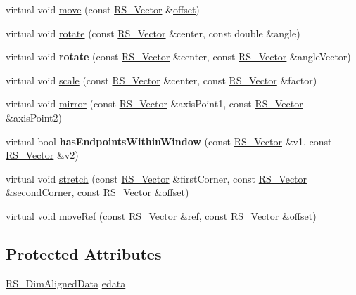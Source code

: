 \begin{DoxyCompactItemize}
\item 
virtual void \hyperlink{classRS__DimAligned_a547e15d7f73058ee892019d69a52c0ac}{move} (const \hyperlink{classRS__Vector}{R\-S\-\_\-\-Vector} \&\hyperlink{classRS__Entity_aa296d21b9aac99161d386ce2f60f0fea}{offset})
\item 
virtual void \hyperlink{classRS__DimAligned_aa40aab80018a3782c5bc3e0084372def}{rotate} (const \hyperlink{classRS__Vector}{R\-S\-\_\-\-Vector} \&center, const double \&angle)
\item 
\hypertarget{classRS__DimAligned_af675c46c8cee55a48d40d0eff4ddb594}{virtual void {\bfseries rotate} (const \hyperlink{classRS__Vector}{R\-S\-\_\-\-Vector} \&center, const \hyperlink{classRS__Vector}{R\-S\-\_\-\-Vector} \&angle\-Vector)}\label{classRS__DimAligned_af675c46c8cee55a48d40d0eff4ddb594}

\item 
virtual void \hyperlink{classRS__DimAligned_a1c66d0395c48a869a1689f5787a35044}{scale} (const \hyperlink{classRS__Vector}{R\-S\-\_\-\-Vector} \&center, const \hyperlink{classRS__Vector}{R\-S\-\_\-\-Vector} \&factor)
\item 
virtual void \hyperlink{classRS__DimAligned_a8607e742167c41abd37adf7a8a0aecd2}{mirror} (const \hyperlink{classRS__Vector}{R\-S\-\_\-\-Vector} \&axis\-Point1, const \hyperlink{classRS__Vector}{R\-S\-\_\-\-Vector} \&axis\-Point2)
\item 
\hypertarget{classRS__DimAligned_ab1a83d26da6eb6d74fc95ee2a72bd707}{virtual bool {\bfseries has\-Endpoints\-Within\-Window} (const \hyperlink{classRS__Vector}{R\-S\-\_\-\-Vector} \&v1, const \hyperlink{classRS__Vector}{R\-S\-\_\-\-Vector} \&v2)}\label{classRS__DimAligned_ab1a83d26da6eb6d74fc95ee2a72bd707}

\item 
virtual void \hyperlink{classRS__DimAligned_a5a87eb946efb2fd52e5f4818992b9482}{stretch} (const \hyperlink{classRS__Vector}{R\-S\-\_\-\-Vector} \&first\-Corner, const \hyperlink{classRS__Vector}{R\-S\-\_\-\-Vector} \&second\-Corner, const \hyperlink{classRS__Vector}{R\-S\-\_\-\-Vector} \&\hyperlink{classRS__Entity_aa296d21b9aac99161d386ce2f60f0fea}{offset})
\item 
virtual void \hyperlink{classRS__DimAligned_a6b31df2f9af8cb4b3e1ef13f6279b31c}{move\-Ref} (const \hyperlink{classRS__Vector}{R\-S\-\_\-\-Vector} \&ref, const \hyperlink{classRS__Vector}{R\-S\-\_\-\-Vector} \&\hyperlink{classRS__Entity_aa296d21b9aac99161d386ce2f60f0fea}{offset})
\end{DoxyCompactItemize}
\subsection*{Protected Attributes}
\begin{DoxyCompactItemize}
\item 
\hyperlink{classRS__DimAlignedData}{R\-S\-\_\-\-Dim\-Aligned\-Data} \hyperlink{classRS__DimAligned_a1b6be27db8722a27eea1d6d50b5387a8}{edata}
\end{DoxyCompactItemize}
